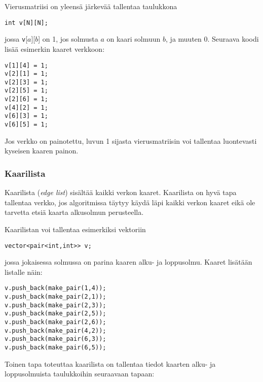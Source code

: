 Vierusmatriisi on yleensä järkevää tallentaa
taulukkona

\begin{lstlisting}
int v[N][N];
\end{lstlisting}

jossa \texttt{v}[$a$][$b$] on 1,
jos solmusta $a$ on kaari solmuun $b$, ja muuten 0.
Seuraava koodi lisää esimerkin kaaret verkkoon:
\begin{lstlisting}
v[1][4] = 1;
v[2][1] = 1;
v[2][3] = 1;
v[2][5] = 1;
v[2][6] = 1;
v[4][2] = 1;
v[6][3] = 1;
v[6][5] = 1;
\end{lstlisting}

Jos verkko on painotettu, luvun 1 sijasta
vierusmatriisin voi tallentaa luontevasti
kyseisen kaaren painon.

\subsubsection*{Kaarilista}

Kaarilista (\textit{edge list}) sisältää kaikki verkon kaaret.
Kaarilista on hyvä tapa tallentaa verkko,
jos algoritmissa täytyy käydä läpi
kaikki verkon kaaret eikä ole tarvetta
etsiä kaarta alkusolmun perusteella.

Kaarilistan voi tallentaa esimerkiksi vektoriin
\begin{lstlisting}
vector<pair<int,int>> v;
\end{lstlisting}
jossa jokaisessa solmussa on parina kaaren
alku- ja loppusolmu.
Kaaret lisätään listalle näin:

\begin{lstlisting}
v.push_back(make_pair(1,4));
v.push_back(make_pair(2,1));
v.push_back(make_pair(2,3));
v.push_back(make_pair(2,5));
v.push_back(make_pair(2,6));
v.push_back(make_pair(4,2));
v.push_back(make_pair(6,3));
v.push_back(make_pair(6,5));
\end{lstlisting}

Toinen tapa toteuttaa kaarilista
on tallentaa tiedot kaarten alku-
ja loppusolmuista taulukkoihin
seuraavaan tapaan:

